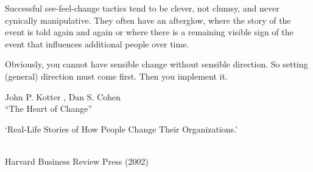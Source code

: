 \documentclass[english,14pt,a4paper,final,oneside]{article}
\begin{document}
Successful see-feel-change tactics tend to be clever, not clumsy, and never cynically manipulative. They often have an afterglow, where the story of the event is told again and again or where there is a remaining visible sign of the event that influences additional people over time.

\vspace{0.6cm}

Obviously, you cannot have sensible change without sensible direction. So setting (general) direction must come first. Then you implement it.


\vspace{1cm}
\begin{flushright}
John P. Kotter , Dan S. Cohen
\\``The Heart of Change''
\\\begin{footnotesize}
`Real-Life Stories of How People Change Their Organizations.'
\end{footnotesize}
\\Harvard Business Review Press (2002)
\end{flushright}
\end{document}
